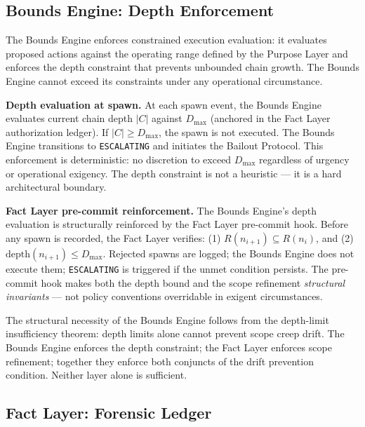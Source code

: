 \subsection{Bounds Engine: Depth Enforcement}
\label{sec:rs-bounds}

The Bounds Engine enforces constrained execution evaluation: it evaluates proposed actions against the operating range defined by the Purpose Layer and enforces the depth constraint that prevents unbounded chain growth. The Bounds Engine cannot exceed its constraints under any operational circumstance.

\medskip
\noindent\textbf{Depth evaluation at spawn.} At each spawn event, the Bounds Engine evaluates current chain depth $|C|$ against $D_{\mathrm{max}}$ (anchored in the Fact Layer authorization ledger). If $|C| \geq D_{\mathrm{max}}$, the spawn is not executed. The Bounds Engine transitions to \texttt{ESCALATING} and initiates the Bailout Protocol. This enforcement is deterministic: no discretion to exceed $D_{\mathrm{max}}$ regardless of urgency or operational exigency. The depth constraint is not a heuristic — it is a hard architectural boundary.

\medskip
\noindent\textbf{Fact Layer pre-commit reinforcement.} The Bounds Engine's depth evaluation is structurally reinforced by the Fact Layer pre-commit hook. Before any spawn is recorded, the Fact Layer verifies: (1) $R(n_{i+1}) \subseteq R(n_i)$, and (2) $\mathrm{depth}(n_{i+1}) \leq D_{\mathrm{max}}$. Rejected spawns are logged; the Bounds Engine does not execute them; \texttt{ESCALATING} is triggered if the unmet condition persists. The pre-commit hook makes both the depth bound and the scope refinement \emph{structural invariants} — not policy conventions overridable in exigent circumstances.

The structural necessity of the Bounds Engine follows from the depth-limit insufficiency theorem: depth limits alone cannot prevent scope creep drift. The Bounds Engine enforces the depth constraint; the Fact Layer enforces scope refinement; together they enforce both conjuncts of the drift prevention condition. Neither layer alone is sufficient.

\subsection{Fact Layer: Forensic Ledger}
\label{sec:rs-fact-ledger}

